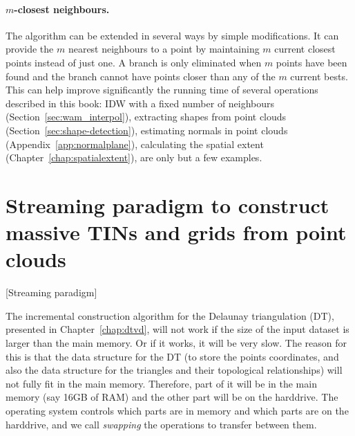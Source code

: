 \paragraph{$m$-closest neighbours.}%
\label{sec:knn-m}

The algorithm can be extended in several ways by simple modifications. 
It can provide the $m$ nearest neighbours to a point by maintaining $m$ current closest points instead of just one. 
A branch is only eliminated when $m$ points have been found and the branch cannot have points closer than any of the $m$ current bests. 
This can help improve significantly the running time of several operations described in this book: IDW with a fixed number of neighbours (Section~\ref{sec:wam_interpol}), extracting shapes from point clouds (Section~\ref{sec:shape-detection}), estimating normals in point clouds (Appendix~\ref{app:normalplane}), calculating the spatial extent (Chapter~\ref{chap:spatialextent}), are only but a few examples.



%
\section[Streaming paradigm to construct massive TINs/grids]{Streaming paradigm to construct massive TINs and grids from point clouds}[Streaming paradigm]%
\label{sec:streaming}

The incremental construction algorithm for the Delaunay triangulation (DT), presented in Chapter~\ref{chap:dtvd}, will not work if the size of the input dataset is larger than the main memory.
Or if it works, it will be very slow.
The reason for this is that the data structure for the DT (to store the points coordinates, and also the data structure for the triangles and their topological relationships) will not fully fit in the main memory.
Therefore, part of it will be in the main memory (say 16GB of RAM) and the other part will be on the harddrive.
The operating system controls which parts are in memory and which parts are on the harddrive, and we call \emph{swapping} the operations to transfer between them.


